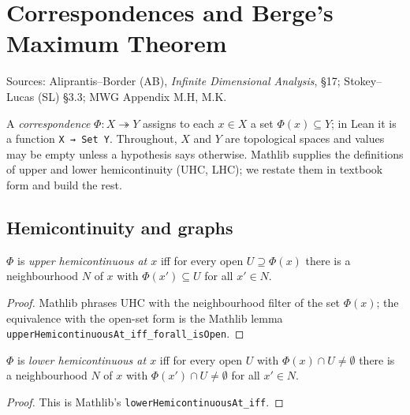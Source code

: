 \chapter{Correspondences and Berge's Maximum Theorem}
\label{chap:foundations}

Sources: Aliprantis--Border (AB), \emph{Infinite Dimensional Analysis}, \S17;
Stokey--Lucas (SL) \S3.3; MWG Appendix M.H, M.K.

A \emph{correspondence} $\Phi : X \twoheadrightarrow Y$ assigns to each $x \in X$ a set
$\Phi(x) \subseteq Y$; in Lean it is a function \texttt{X → Set Y}. Throughout, $X$ and $Y$
are topological spaces and values may be empty unless a hypothesis says otherwise.
Mathlib supplies the definitions of upper and lower hemicontinuity (UHC, LHC); we restate
them in textbook form and build the rest.

\section{Hemicontinuity and graphs}
\label{sec:hemicontinuity}

\begin{definition}
\label{def:uhc}
\leanok
$\Phi$ is \emph{upper hemicontinuous at $x$} iff for every open $U \supseteq \Phi(x)$ there is a
neighbourhood $N$ of $x$ with $\Phi(x') \subseteq U$ for all $x' \in N$.
\end{definition}
\begin{proof}
\leanok
Mathlib phrases UHC with the neighbourhood filter of the set $\Phi(x)$; the equivalence with the
open-set form is the Mathlib lemma \texttt{upperHemicontinuousAt\_iff\_forall\_isOpen}.
\end{proof}

\begin{definition}
\label{def:lhc}
\leanok
$\Phi$ is \emph{lower hemicontinuous at $x$} iff for every open $U$ with
$\Phi(x) \cap U \neq \emptyset$ there is a neighbourhood $N$ of $x$ with
$\Phi(x') \cap U \neq \emptyset$ for all $x' \in N$.
\end{definition}
\begin{proof}
\leanok
This is Mathlib's \texttt{lowerHemicontinuousAt\_iff}.
\end{proof}

